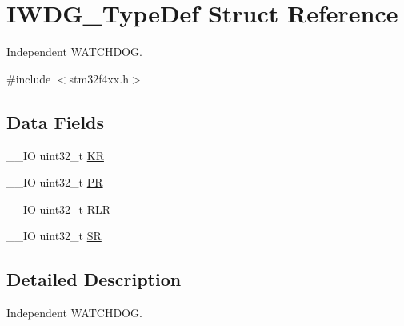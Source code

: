 \hypertarget{struct_i_w_d_g___type_def}{\section{I\-W\-D\-G\-\_\-\-Type\-Def Struct Reference}
\label{struct_i_w_d_g___type_def}
}


Independent W\-A\-T\-C\-H\-D\-O\-G.  




{\ttfamily \#include $<$stm32f4xx.\-h$>$}

\subsection*{Data Fields}
\begin{DoxyCompactItemize}
\item 
\-\_\-\-\_\-\-I\-O uint32\-\_\-t \hyperlink{struct_i_w_d_g___type_def_a2f692354bde770f2a5e3e1b294ec064b}{K\-R}
\item 
\-\_\-\-\_\-\-I\-O uint32\-\_\-t \hyperlink{struct_i_w_d_g___type_def_af8d25514079514d38c104402f46470af}{P\-R}
\item 
\-\_\-\-\_\-\-I\-O uint32\-\_\-t \hyperlink{struct_i_w_d_g___type_def_a7015e1046dbd3ea8783b33dc11a69e52}{R\-L\-R}
\item 
\-\_\-\-\_\-\-I\-O uint32\-\_\-t \hyperlink{struct_i_w_d_g___type_def_af6aca2bbd40c0fb6df7c3aebe224a360}{S\-R}
\end{DoxyCompactItemize}


\subsection{Detailed Description}
Independent W\-A\-T\-C\-H\-D\-O\-G. 

